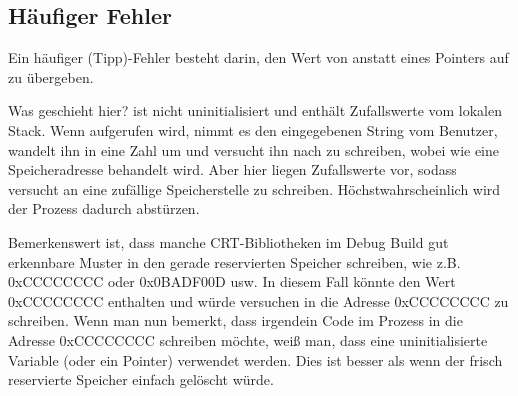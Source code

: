 \subsection{Häufiger Fehler}
Ein häufiger (Tipp)-Fehler besteht darin, den Wert von  anstatt eines Pointers auf  zu übergeben.



Was geschieht hier?
 ist nicht uninitialisiert und enthält Zufallswerte vom lokalen Stack. Wenn \scanf aufgerufen wird, nimmt es den eingegebenen String vom Benutzer, wandelt ihn in eine Zahl um und versucht ihn nach  zu schreiben, wobei  wie eine Speicheradresse behandelt wird.
Aber hier liegen Zufallswerte vor, sodass \scanf versucht an eine zufällige Speicherstelle zu schreiben. 
Höchstwahrscheinlich wird der Prozess dadurch abstürzen.

Bemerkenswert ist, dass manche \ac{CRT}-Bibliotheken im Debug Build gut erkennbare Muster in den gerade reservierten Speicher schreiben, wie z.B. 0xCCCCCCCC oder 0x0BADF00D usw.
In diesem Fall könnte  den Wert 0xCCCCCCCC enthalten und \scanf würde versuchen in die Adresse 0xCCCCCCCC zu schreiben. 
Wenn man nun bemerkt, dass irgendein Code im Prozess in die Adresse 0xCCCCCCCC schreiben möchte, weiß man, dass eine uninitialisierte Variable (oder ein Pointer) verwendet werden.
Dies ist besser als wenn der frisch reservierte Speicher einfach gelöscht würde.


